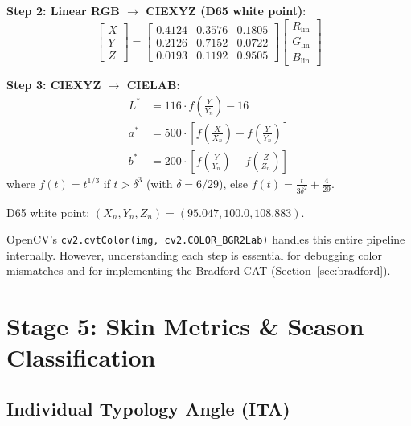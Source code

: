 \documentclass[12pt,a4paper]{article}
\begin{document}
\textbf{Step 2: Linear RGB $\to$ CIEXYZ (D65 white point)}:
\begin{equation}
\begin{bmatrix} X \\ Y \\ Z \end{bmatrix} =
\begin{bmatrix}
0.4124 & 0.3576 & 0.1805 \\
0.2126 & 0.7152 & 0.0722 \\
0.0193 & 0.1192 & 0.9505
\end{bmatrix}
\begin{bmatrix} R_{\text{lin}} \\ G_{\text{lin}} \\ B_{\text{lin}} \end{bmatrix}
\end{equation}

\textbf{Step 3: CIEXYZ $\to$ CIELAB}:
\begin{align}
L^* &= 116 \cdot f\!\left(\frac{Y}{Y_n}\right) - 16 \\
a^* &= 500 \cdot \left[f\!\left(\frac{X}{X_n}\right) - f\!\left(\frac{Y}{Y_n}\right)\right] \\
b^* &= 200 \cdot \left[f\!\left(\frac{Y}{Y_n}\right) - f\!\left(\frac{Z}{Z_n}\right)\right]
\end{align}
where $f(t) = t^{1/3}$ if $t > \delta^3$ (with $\delta = 6/29$), else $f(t) = \frac{t}{3\delta^2} + \frac{4}{29}$.

D65 white point: $(X_n, Y_n, Z_n) = (95.047, 100.0, 108.883)$.

\begin{infoblock}
OpenCV's \texttt{cv2.cvtColor(img, cv2.COLOR\_BGR2Lab)} handles this entire pipeline internally. However, understanding each step is essential for debugging color mismatches and for implementing the Bradford CAT (Section~\ref{sec:bradford}).
\end{infoblock}


\section{Stage 5: Skin Metrics \& Season Classification}

\subsection{Individual Typology Angle (ITA\textdegree{})}
\label{sec:ita}
\end{document}
